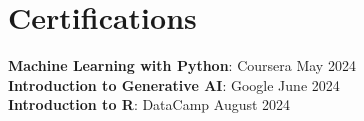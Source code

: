 \documentclass[letterpaper,11pt]{article}
\begin{document}

\section{Certifications}
\begin{itemize}[leftmargin=0.15in, label={}]
   \small{\item{
    \textbf{Machine Learning with Python}{: Coursera May 2024} \\
    \textbf{Introduction to Generative AI}{: Google June 2024} \\
    \textbf{Introduction to R}{: DataCamp August 2024} \\
   }}
 \end{itemize}
\end{document}
